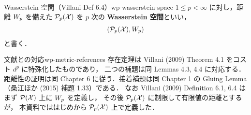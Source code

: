 \begin{definition}{Wasserstein 空間（Villani Def 6.4）}{wp-wasserstein-space}
  $1\leq p<\infty$ に対し，距離 $W_p$ を備えた
  $\mathcal{P}_{p}(\mathcal{X})$ を $p$ 次の \textbf{Wasserstein 空間}といい，
  \[
    (\mathcal{P}_{p}(\mathcal{X}),W_p)
  \]
  と書く．
\end{definition}

\begin{remark}{文献との対応}{wp-metric-references}
  存在定理は Villani (2009) Theorem 4.1 をコスト $d^p$ に特殊化したものであり，
  二つの補題は同 Lemmas 4.3, 4.4 に対応する．
  距離性の証明は同 Chapter 6 に従う．接着補題は同 Chapter 1 の
  Gluing Lemma（桑江ほか (2015) 補題 1.33）である．
  なお Villani (2009) Definition 6.1, 6.4 は
  まず $\mathcal{P}(\mathcal{X})$ 上に $W_p$ を定義し，
  その後 $\mathcal{P}_{p}(\mathcal{X})$ に制限して有限値の距離とするが，
  本資料でははじめから $\mathcal{P}_{p}(\mathcal{X})$ 上で定義した．
\end{remark}
